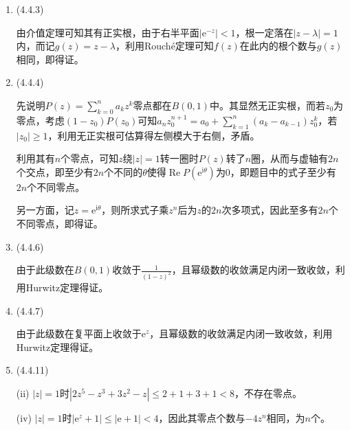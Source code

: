 \documentclass[a4paper,UTF8,fontset=windows]{ctexart}
\DeclareMathOperator{\re}{Re}
\begin{document}
\begin{enumerate}
    \item (4.4.3)
    
    由介值定理可知其有正实根，由于右半平面$|\mathrm{e}^{-z}|<1$，根一定落在$|z-\lambda|=1$内，而记$g(z)=z-\lambda$，利用Rouch\'e定理可知$f(z)$在此内的根个数与$g(z)$相同，即得证。
    
    \item (4.4.4)
    
    先说明$P(z)=\sum_{k=0}^na_kz^k$零点都在$B(0,1)$中。其显然无正实根，而若$z_0$为零点，考虑$(1-z_0)P(z_0)$可知$a_nz_0^{n+1}=a_0+\sum_{k=1}^n(a_k-a_{k-1})z_0^k$，若$|z_0|\ge1$，利用无正实根可估算得左侧模大于右侧，矛盾。
    
    利用其有$n$个零点，可知$z$绕$|z|=1$转一圈时$P(z)$转了$n$圈，从而与虚轴有$2n$个交点，即至少有$2n$个不同的$\theta$使得$\re P(\mathrm{e}^{\mathrm{i}\theta})$为0，即题目中的式子至少有$2n$个不同零点。
    
    另一方面，记$z=\mathrm{e}^{\mathrm{i}\theta}$，则所求式子乘$z^n$后为$z$的$2n$次多项式，因此至多有$2n$个不同零点，即得证。
    
    \item (4.4.6)
    
    由于此级数在$B(0,1)$收敛于$\frac{1}{(1-z)^2}$，且幂级数的收敛满足内闭一致收敛，利用Hurwitz定理得证。
    
    \item (4.4.7)
    
    由于此级数在复平面上收敛于$\mathrm{e}^z$，且幂级数的收敛满足内闭一致收敛，利用Hurwitz定理得证。
    
    \item (4.4.11)
    
    (ii) $|z|=1$时$|2z^5-z^3+3z^2-z|\le2+1+3+1<8$，不存在零点。
    
    (iv) $|z|=1$时$|\mathrm{e}^z+1|\le|\mathrm{e}+1|<4$，因此其零点个数与$-4z^n$相同，为$n$个。
\end{enumerate}
\end{document}
